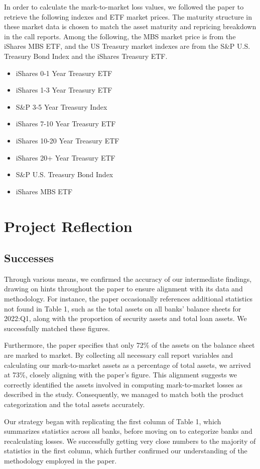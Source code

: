 \documentclass{article}
\begin{document}
In order to calculate the mark-to-market loss values, we followed the paper to retrieve the following indexes and ETF market prices. The maturity structure in these market data is chosen to match the asset maturity and repricing breakdown in the call reports. Among the following, the MBS market price is from the iShares MBS ETF, and the US Treasury market indexes are from the S\&P U.S. Treasury Bond Index and the iShares Treasury ETF.
\begin{itemize}
\item iShares 0-1 Year Treasury ETF
\item iShares 1-3 Year Treasury ETF
\item S\&P 3-5 Year Treasury Index
\item iShares 7-10 Year Treasury ETF
\item iShares 10-20 Year Treasury ETF
\item iShares 20+ Year Treasury ETF
\item S\&P U.S. Treasury Bond Index
\item iShares MBS ETF
\end{itemize}


\section{Project Reflection}
\subsection{Successes}
Through various means, we confirmed the accuracy of our intermediate findings, drawing on hints throughout the paper to ensure alignment with its data and methodology. For instance, the paper occasionally references additional statistics not found in Table 1, such as the total assets on all banks' balance sheets for 2022:Q1, along with the proportion of security assets and total loan assets. We successfully matched these figures.

Furthermore, the paper specifies that only 72\% of the assets on the balance sheet are marked to market. By collecting all necessary call report variables and calculating our mark-to-market assets as a percentage of total assets, we arrived at 73\%, closely aligning with the paper's figure. This alignment suggests we correctly identified the assets involved in computing mark-to-market losses as described in the study. Consequently, we managed to match both the product categorization and the total assets accurately.

Our strategy began with replicating the first column of Table 1, which summarizes statistics across all banks, before moving on to categorize banks and recalculating losses. We successfully getting very close numbers to the majority of statistics in the first column, which further confirmed our understanding of the methodology employed in the paper.
\end{document}
